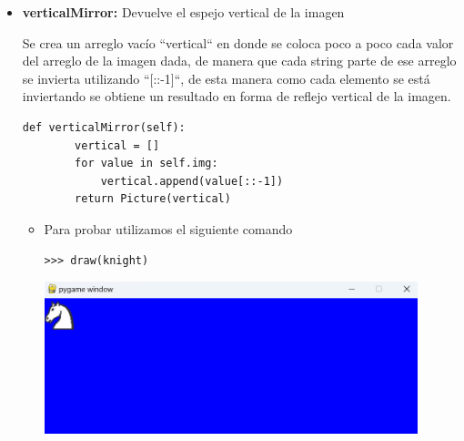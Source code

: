 \documentclass{article}
\begin{document}
  \begin{itemize}

  \item \textbf{verticalMirror:} Devuelve el espejo vertical de la imagen
  
  \vspace{\baselineskip}

  Se crea un arreglo vacío ``vertical`` en donde se coloca poco a poco cada valor del arreglo de la imagen dada, de manera que cada string parte de ese arreglo se invierta utilizando ``[::-1]``, de esta manera como cada elemento se está inviertando se obtiene un resultado en forma de reflejo vertical de la imagen.
  
    \begin{lstlisting}[style=python]
    def verticalMirror(self):
        vertical = []
        for value in self.img:
            vertical.append(value[::-1])
        return Picture(vertical)
    \end{lstlisting}

    \vspace{\baselineskip}

    \begin{itemize}
      \item Para probar utilizamos el siguiente comando

      \begin{lstlisting}[style=shell]
      >>> draw(knight)
      \end{lstlisting}
      \begin{minipage}{\linewidth}
        \centering
        \includegraphics[width=0.9\textwidth]{imagenes/p_vertical1.png}
      \end{minipage}

      \vspace{2\baselineskip}


\end{itemize}
\end{itemize}
\end{document}
